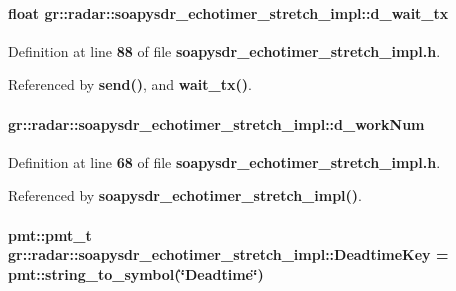 \paragraph[{d\+\_\+wait\+\_\+tx}]{\setlength{\rightskip}{0pt plus 5cm}float gr\+::radar\+::soapysdr\+\_\+echotimer\+\_\+stretch\+\_\+impl\+::d\+\_\+wait\+\_\+tx\hspace{0.3cm}{\ttfamily [private]}}\label{classgr_1_1radar_1_1soapysdr__echotimer__stretch__impl_a1aaefc14725dc3e6cb232b141021a8ac}


Definition at line {\bf 88} of file {\bf soapysdr\+\_\+echotimer\+\_\+stretch\+\_\+impl.\+h}.



Referenced by {\bf send()}, and {\bf wait\+\_\+tx()}.

\paragraph[{d\+\_\+work\+Num}]{ gr\+::radar\+::soapysdr\+\_\+echotimer\+\_\+stretch\+\_\+impl\+::d\+\_\+work\+Num\hspace{0.3cm}{\ttfamily [private]}}\label{classgr_1_1radar_1_1soapysdr__echotimer__stretch__impl_aefaf199e7b500fd50aa4560758334898}


Definition at line {\bf 68} of file {\bf soapysdr\+\_\+echotimer\+\_\+stretch\+\_\+impl.\+h}.



Referenced by {\bf soapysdr\+\_\+echotimer\+\_\+stretch\+\_\+impl()}.

\paragraph[{Deadtime\+Key}]{\setlength{\rightskip}{0pt plus 5cm}pmt\+::pmt\+\_\+t gr\+::radar\+::soapysdr\+\_\+echotimer\+\_\+stretch\+\_\+impl\+::\+Deadtime\+Key = pmt\+::string\+\_\+to\+\_\+symbol(\char`\"{}Deadtime\char`\"{})\hspace{0.3cm}{\ttfamily [private]}}\label{classgr_1_1radar_1_1soapysdr__echotimer__stretch__impl_a932fc9dca94bbba761f4e17820b14ec9}


